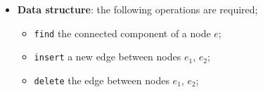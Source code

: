 \begin{frame}[fragile]{\secname}{\subsecname}
\begin{block}
\begin{itemize}
\begin{multicols}{2}
\end{multicols}
\vspace{-.4cm}
\item<19-> \textbf{Data structure}: the following operations are required;
\begin{itemize}
\item<20-> \texttt{find} the connected component of a node $e$;
\item<21-> \texttt{insert} a new edge between nodes $e_1$, $e_2$;
\item<22-> \texttt{delete} the edge between nodes $e_1$, $e_2$;
\end{itemize}
\end{itemize}
\end{block}
\end{frame}


